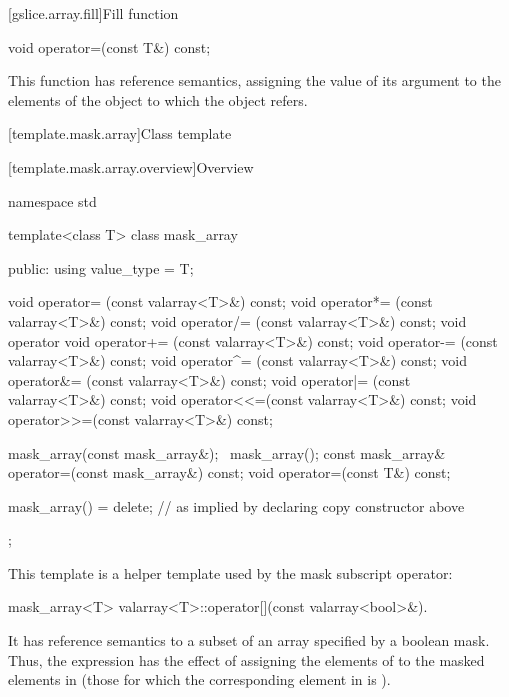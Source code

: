 [gslice.array.fill]{Fill function}

%
\begin{itemdecl}
void operator=(const T&) const;
\end{itemdecl}

\begin{itemdescr}
\pnum
This function has reference semantics, assigning the value of its argument
to the elements of the
object to which the
object refers.
\end{itemdescr}

[template.mask.array]{Class template }

[template.mask.array.overview]{Overview}

%
%
\begin{codeblock}
namespace std {
  template<class T> class mask_array {
  public:
    using value_type = T;

    void operator=  (const valarray<T>&) const;
    void operator*= (const valarray<T>&) const;
    void operator/= (const valarray<T>&) const;
    void operator%
    void operator+= (const valarray<T>&) const;
    void operator-= (const valarray<T>&) const;
    void operator^= (const valarray<T>&) const;
    void operator&= (const valarray<T>&) const;
    void operator|= (const valarray<T>&) const;
    void operator<<=(const valarray<T>&) const;
    void operator>>=(const valarray<T>&) const;

    mask_array(const mask_array&);
    ~mask_array();
    const mask_array& operator=(const mask_array&) const;
    void operator=(const T&) const;

    mask_array() = delete;      // as implied by declaring copy constructor above
  };
}
\end{codeblock}

\pnum
This template is a helper template used by the mask subscript operator:
%
\begin{itemdecl}
mask_array<T> valarray<T>::operator[](const valarray<bool>&).
\end{itemdecl}

\pnum
It has reference semantics to a subset of an array specified by a boolean mask.
Thus, the expression 
has the effect of assigning the elements of
 to the masked elements in 
(those for which the corresponding element in
 is ).

